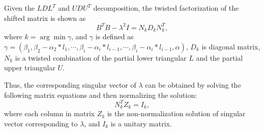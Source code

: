 Given the $LDL^T$ and $UDU^T$ decomposition, the twisted factorization of the shifted matrix is shown as
\begin{equation}
B^T B - \lambda^2 I = N_k D_k N_k^T ,
\label{eq:twisted}
\end{equation}
where $k = \arg \min \gamma$, and $\gamma$ is defined as
$\gamma = (\beta_1, \beta_2 - \alpha_2 * l_1, \cdots, \beta_i - \alpha_i * l_{i-1}, \cdots, \beta_i - \alpha_i * l_{i-1}, \alpha)$, 
$D_k$ is diagonal matrix, $N_k$ is a twisted combination of the partial lower triangular $L$ and the partial upper triangular $U$.

Thus, the corresponding singular vector of $\lambda$ can be obtained by solving the following matrix equations and then normalizing the solution:
\begin{equation}
\label{eq:unnorm}
N_k^T Z_k = I_k ,
\end{equation}
 where each column in matrix $Z_k$ is the non-normalization solution of singular vector corresponding to $\lambda$, and $I_k$ is a unitary matrix.

